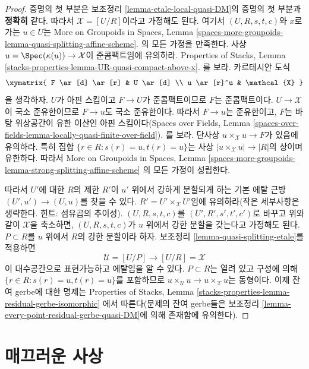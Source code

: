 \begin{proof}
증명의 첫 부분은 보조정리 \ref{lemma-etale-local-quasi-DM}의 증명의 첫
부분과 {\bf 정확히} 같다. 따라서 $\mathcal{X} = [U/R]$이라고 가정해도
된다. 여기서 $(U, R, s, t, c)$와 $x$로 가는 $u \in U$는 More on
Groupoids in Spaces, Lemma
\ref{spaces-more-groupoids-lemma-quasi-splitting-affine-scheme}.
의 모든 가정을 만족한다. 사상
$u = \Spec(\kappa(u)) \to \mathcal{X}$이 준콤팩트임에 유의하라.
Properties of Stacks, Lemma
\ref{stacks-properties-lemma-UR-quasi-compact-above-x}.
를 보라. 카르테시안 도식
$$
\xymatrix{
F \ar[d] \ar[r] & U \ar[d] \\
u \ar[r]^u & \mathcal{X}
}
$$
을 생각하자. $U$가 아핀 스킴이고 $F \to U$가 준콤팩트이므로 $F$는
준콤팩트이다. $U \to \mathcal{X}$이 국소 준유한이므로 $F \to u$도
국소 준유한이다. 따라서 $F \to u$는 준유한이고, $F$는 바탕 위상공간이
유한 이산인 아핀 스킴이다(Spaces over Fields, Lemma
\ref{spaces-over-fields-lemma-locally-quasi-finite-over-field}).
를 보라. 단사상 $u \times_\mathcal{X} u \to F$가 있음에 유의하라.
특히 집합 $\{r \in R : s(r) = u, t(r) = u\}$는 사상
$|u \times_\mathcal{X} u| \to |R|$의 상이며 유한하다. 따라서 More on
Groupoids in Spaces, Lemma
\ref{spaces-more-groupoids-lemma-strong-splitting-affine-scheme}
의 모든 가정이 성립한다.%

\medskip\noindent
따라서 $U'$에 대한 $R$의 제한 $R'$이 $u'$ 위에서 강하게 분할되게 하는
기본 에탈 근방 $(U', u') \to (U, u)$를 찾을 수 있다.
$R' = U' \times_\mathcal{X} U'$임에 유의하라(작은 세부사항은 생략한다.
힌트: 섬유곱의 추이성). $(U, R, s, t, c)$를
$(U', R', s', t', c')$로 바꾸고 위와 같이 $\mathcal{X}$을 축소하면,
$(U, R, s, t, c)$가 $u$ 위에서 강한 분할을 갖는다고 가정해도 된다.
$P \subset R$를 $u$ 위에서 $R$의 강한 분할이라 하자. 보조정리
\ref{lemma-quasi-splitting-etale}를 적용하면
$$
\mathcal{U} = [U/P] \longrightarrow [U/R] = \mathcal{X}
$$
이 대수공간으로 표현가능하고 에탈임을 알 수 있다. $P \subset R$는
열려 있고 구성에 의해 $\{r \in R : s(r) = u, t(r) = u\}$를 포함하므로
$u \times_\mathcal{U} u \to u \times_\mathcal{X} u$는 동형이다. 이제
잔여 gerbe에 대한 명제는 Properties of Stacks, Lemma
\ref{stacks-properties-lemma-residual-gerbe-isomorphic}
에서 따른다(문제의 잔여 gerbe들은 보조정리
\ref{lemma-every-point-residual-gerbe-quasi-DM}에 의해 존재함에 유의한다).
\end{proof}







\section{매끄러운 사상}
\label{section-smooth}

